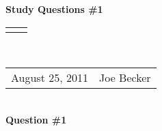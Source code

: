 \documentclass[11pt]{article}
\numberwithin{equation}{section}
\renewcommand{\title}[1]{\textbf{#1}\\}
\renewcommand{\line}{\begin{tabularx}{\textwidth}{X>{\raggedleft}X}\hline\\\end{tabularx}\\[-0.5cm]}
\newcommand{\leftright}[2]{\begin{tabularx}{\textwidth}{X>{\raggedleft}X}#1%
& #2\\\end{tabularx}\\[-0.5cm]}
\begin{document}
\title{Study Questions \#1}
\line
\leftright{August 25, 2011}{Joe Becker} %

\textbf{Question \#1}\\
\indent \textit{\indent }\\
\end{document}

